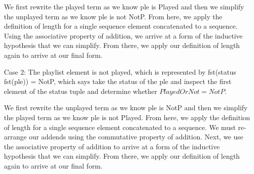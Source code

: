 \documentclass[a4paper,10pt,fleqn]{article}
\begin{document}
\noindent We first rewrite the played term as we know ple is Played and then we simplify the unplayed term as we know ple is not NotP. From here, we apply the definition of length for a single sequence element concatenated to a sequence. Using the associative property of addition, we arrive at a form of the inductive hypothesis that we can simplify.  From there, we apply our definition of length again to arrive at our final form.

\bigskip

\noindent Case 2: The playlist element is not played, which is represented by fst(status fst(ple)) = NotP, which says take the status of the ple and inspect the first element of the status tuple and determine whether $PlayedOrNot = NotP$.

\bigskip

\begin{center}
\end{center}
\bigskip

\noindent We first rewrite the unplayed term as we know ple is NotP and then we simplify the played term as we know ple is not Played. From here, we apply the definition of length for a single sequence element concatenated to a sequence. We must re-arrange our addends using the commutative property of addition.  Next, we use the associative property of addition to arrive at a form of the inductive hypothesis that we can simplify.  From there, we apply our definition of length again to arrive at our final form.
\end{document}
